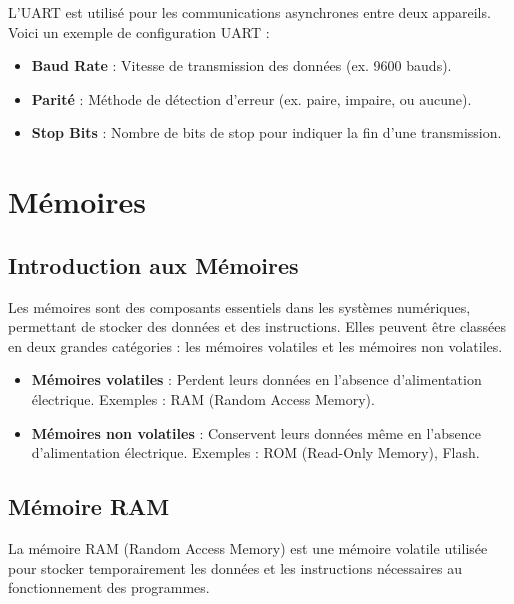 \documentclass[10pt,a4paper]{article}
\begin{document}
L'UART est utilisé pour les communications asynchrones entre deux appareils. Voici un exemple de configuration UART :
\begin{itemize}
    \item \textbf{Baud Rate} : Vitesse de transmission des données (ex. 9600 bauds).
    \item \textbf{Parité} : Méthode de détection d'erreur (ex. paire, impaire, ou aucune).
    \item \textbf{Stop Bits} : Nombre de bits de stop pour indiquer la fin d'une transmission.
\end{itemize}


\section*{Mémoires}

\subsection*{Introduction aux Mémoires}

Les mémoires sont des composants essentiels dans les systèmes numériques, permettant de stocker des données et des instructions. Elles peuvent être classées en deux grandes catégories : les mémoires volatiles et les mémoires non volatiles.

\begin{itemize}
    \item \textbf{Mémoires volatiles} : Perdent leurs données en l'absence d'alimentation électrique. Exemples : RAM (Random Access Memory).
    \item \textbf{Mémoires non volatiles} : Conservent leurs données même en l'absence d'alimentation électrique. Exemples : ROM (Read-Only Memory), Flash.
\end{itemize}


\subsection*{Mémoire RAM}

La mémoire RAM (Random Access Memory) est une mémoire volatile utilisée pour stocker temporairement les données et les instructions nécessaires au fonctionnement des programmes.
\end{document}
